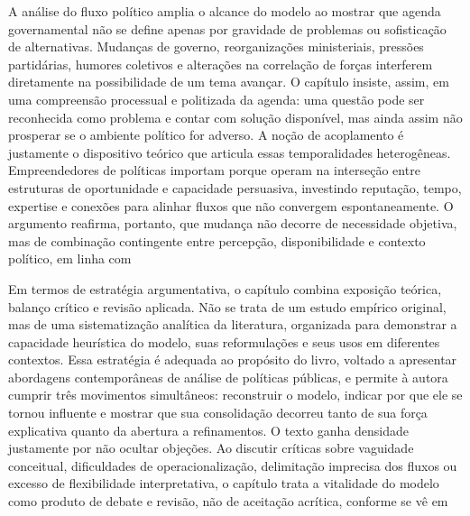 \documentclass[12pt,a4paper]{article}
\begin{document}
A análise do fluxo político amplia o alcance do modelo ao mostrar que agenda governamental não se define apenas por gravidade de problemas ou sofisticação de alternativas. Mudanças de governo, reorganizações ministeriais, pressões partidárias, humores coletivos e alterações na correlação de forças interferem diretamente na possibilidade de um tema avançar. O capítulo insiste, assim, em uma compreensão processual e politizada da agenda: uma questão pode ser reconhecida como problema e contar com solução disponível, mas ainda assim não prosperar se o ambiente político for adverso. A noção de acoplamento é justamente o dispositivo teórico que articula essas temporalidades heterogêneas. Empreendedores de políticas importam porque operam na interseção entre estruturas de oportunidade e capacidade persuasiva, investindo reputação, tempo, expertise e conexões para alinhar fluxos que não convergem espontaneamente. O argumento reafirma, portanto, que mudança não decorre de necessidade objetiva, mas de combinação contingente entre percepção, disponibilidade e contexto político, em linha com\parencite{brasil2022_abordagens_contemporaneas}

Em termos de estratégia argumentativa, o capítulo combina exposição teórica, balanço crítico e revisão aplicada. Não se trata de um estudo empírico original, mas de uma sistematização analítica da literatura, organizada para demonstrar a capacidade heurística do modelo, suas reformulações e seus usos em diferentes contextos. Essa estratégia é adequada ao propósito do livro, voltado a apresentar abordagens contemporâneas de análise de políticas públicas, e permite à autora cumprir três movimentos simultâneos: reconstruir o modelo, indicar por que ele se tornou influente e mostrar que sua consolidação decorreu tanto de sua força explicativa quanto da abertura a refinamentos. O texto ganha densidade justamente por não ocultar objeções. Ao discutir críticas sobre vaguidade conceitual, dificuldades de operacionalização, delimitação imprecisa dos fluxos ou excesso de flexibilidade interpretativa, o capítulo trata a vitalidade do modelo como produto de debate e revisão, não de aceitação acrítica, conforme se vê em\parencite{brasil2022_abordagens_contemporaneas}
\end{document}
